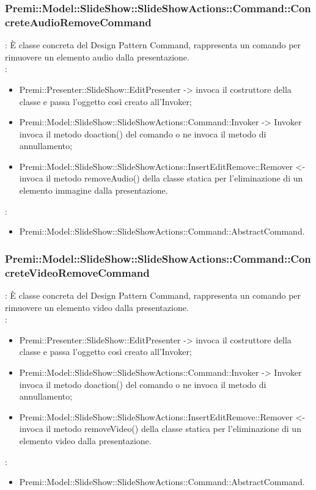{                    \subsubsection{Premi::Model::SlideShow::SlideShowActions::Command::ConcreteAudioRemoveCommand}{
				\textbf{\tipo}: È classe concreta del Design Pattern Command, rappresenta un comando per rimuovere un elemento audio dalla presentazione.\\	
				\textbf{\relaz}: 
				\begin{itemize}
					\item Premi::Presenter::SlideShow::EditPresenter -> invoca il costruttore della classe e passa l’oggetto così creato all’Invoker;
					\item Premi::Model::SlideShow::SlideShowActions::Command::Invoker -> Invoker invoca il metodo doaction() del comando o ne invoca il metodo di annullamento;
                    \item Premi::Model::SlideShow::SlideShowActions::InsertEditRemove::Remover <- invoca il metodo removeAudio() della classe statica per l’eliminazione di un elemento immagine dalla presentazione.
				\end{itemize}	
                \textbf{\base}: 
                    \begin{itemize}
                    \item Premi::Model::SlideShow::SlideShowActions::Command::AbstractCommand.
                    \end{itemize}
                    }
                    \subsubsection{Premi::Model::SlideShow::SlideShowActions::Command::ConcreteVideoRemoveCommand}{
				\textbf{\tipo}: È classe concreta del Design Pattern Command, rappresenta un comando per rimuovere un elemento video dalla presentazione.\\	
				\textbf{\relaz}: 
				\begin{itemize}
					\item Premi::Presenter::SlideShow::EditPresenter -> invoca il costruttore della classe e passa l’oggetto così creato all’Invoker;
					\item Premi::Model::SlideShow::SlideShowActions::Command::Invoker -> Invoker invoca il metodo doaction() del comando o ne invoca il metodo di annullamento;
                    \item Premi::Model::SlideShow::SlideShowActions::InsertEditRemove::Remover <- invoca il metodo removeVideo() della classe statica per l’eliminazione di un elemento video dalla presentazione.
				\end{itemize}
                \textbf{\base}: 
                    \begin{itemize}
                    \item Premi::Model::SlideShow::SlideShowActions::Command::AbstractCommand.
                    \end{itemize}
                    }
}

